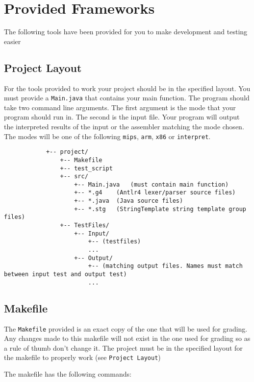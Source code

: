 \documentclass{article}
\begin{document}
\section{Provided Frameworks}

	The following tools have been provided for you to make development and testing easier

	\subsection{Project Layout}

		For the tools provided to work your project should be in the specified layout. You must provide a \texttt{Main.java} that contains your main function. The program should take two command line arguments. The first argument is the mode that your program should run in. The second is the input file. Your program will output the interpreted results of the input or the assembler matching the mode chosen. The modes will be one of the following \texttt{mips}, \texttt{arm}, \texttt{x86} or \texttt{interpret}.

		\begin{lstlisting}
			+-- project/
				+-- Makefile
				+-- test_script
				+-- src/
					+-- Main.java	(must contain main function)
					+-- *.g4	(Antlr4 lexer/parser source files)
					+-- *.java	(Java source files)
					+-- *.stg	(StringTemplate string template group files)
				+-- TestFiles/
					+-- Input/
						+-- (testfiles)
						...
					+-- Output/
						+-- (matching output files. Names must match between input test and output test)
						...
		\end{lstlisting}


	\subsection{Makefile}

		The \texttt{Makefile} provided is an exact copy of the one that will be used for grading.  Any changes made to
		this makefile will not exist in the one used for grading so as a rule of thumb don't change it. The project must
		be in the specified layout for the makefile to properly work (see \texttt{Project Layout})

		The makefile has the following commands:
\end{document}
